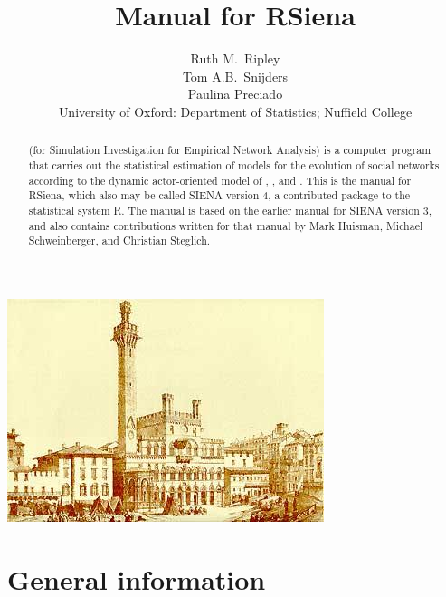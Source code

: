 \documentclass[a4paper,fleqn,11pt]{article}
\title{{\Huge Manual for \textsf{RSiena} } }
\author{\Large Ruth M.\ Ripley\\[1ex]
        \Large Tom A.B.\ Snijders\\[1ex]
        \Large Paulina Preciado  \\[4ex]
       {\large University of Oxford: Department of Statistics; Nuffield College}\\[1ex]
    }
\newcommand{\+}{\, + \,}
\newcommand{\Rn}{{\sf R}}
\newcommand{\rs}{{\sf RSiena}}
\newcommand{\SI}{{\sf SIENA }}
\begin{document}

\maketitle

\vfill
\begin{center}
\includegraphics*[scale=3]{ilcampo.jpg}
\end{center}
\vfill

\begin{abstract}
\noindent \SI (for {\sf Simulation Investigation for Empirical
Network Analysis}) is a computer program that carries out the
statistical estimation of models for the evolution of social
networks according to the dynamic actor-oriented model of \citet{Snijders01,
Snijders05}, \citet*{SnijdersEA07}, and \citet*{SnijdersEA10a}.
This is the manual for \rs, which also may be called \SI version 4,
a contributed package to the statistical system \Rn.
The manual is based on the earlier manual for \SI version 3,
and also contains contributions written for that manual by
Mark Huisman, Michael Schweinberger, and Christian Steglich.
\end{abstract}




\vfill
\newpage
\tableofcontents
\newpage

\makeatletter
\def\@linkcolor{lc}
\makeatother

\section{General information}
\end{document}
